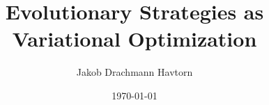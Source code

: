 










\title[Corti]{Evolutionary Strategies as Variational Optimization}
\author{Jakob Drachmann Havtorn}
\date{\today}











